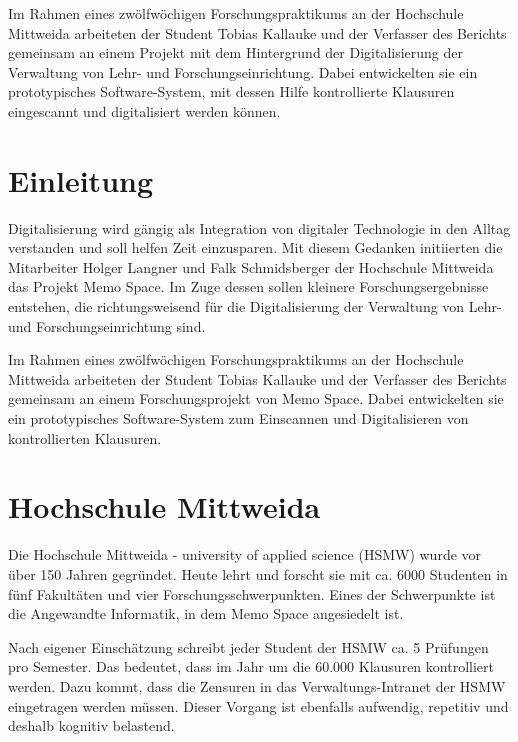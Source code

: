 \documentclass[notables, nomenclature, oneside, 150]{HSMW-Thesis}
\begin{document}
\begin{Referat}
Im Rahmen eines zwölfwöchigen Forschungspraktikums an der Hochschule Mittweida arbeiteten der Student Tobias Kallauke und der Verfasser des Berichts gemeinsam an einem Projekt mit dem Hintergrund der Digitalisierung der Verwaltung von Lehr- und Forschungseinrichtung. Dabei entwickelten sie ein prototypisches Software-System, mit dessen Hilfe kontrollierte Klausuren eingescannt und digitalisiert werden können.
\end{Referat}

\Hauptteil


\chapter{Einleitung}
	Digitalisierung wird gängig als Integration von digitaler Technologie in den Alltag verstanden und soll helfen Zeit einzusparen. Mit diesem Gedanken initiierten die Mitarbeiter Holger Langner und Falk Schmidsberger der Hochschule Mittweida das Projekt Memo Space. Im Zuge dessen sollen kleinere Forschungsergebnisse entstehen, die richtungsweisend für die Digitalisierung der Verwaltung von Lehr- und Forschungseinrichtung sind.

	Im Rahmen eines zwölfwöchigen Forschungspraktikums an der Hochschule Mittweida arbeiteten der Student Tobias Kallauke und der Verfasser des Berichts gemeinsam an einem Forschungsprojekt von Memo Space. Dabei entwickelten sie ein prototypisches Software-System zum Einscannen und Digitalisieren von kontrollierten Klausuren.


\chapter{Hochschule Mittweida}
	Die Hochschule Mittweida - university of applied science (HSMW)  wurde vor über 150 Jahren gegründet. Heute lehrt und forscht sie mit ca. 6000 Studenten in fünf Fakultäten und vier Forschungsschwerpunkten\cite{hochschule_mittweida_hochschule_nodate}. Eines der Schwerpunkte ist die Angewandte Informatik, in dem Memo Space angesiedelt ist.
	
	Nach eigener Einschätzung schreibt jeder Student der HSMW ca. 5 Prüfungen pro Semester. Das bedeutet, dass im Jahr um die 60.000 Klausuren kontrolliert werden. Dazu kommt, dass die Zensuren in das Verwaltungs-Intranet der HSMW eingetragen werden müssen. Dieser Vorgang ist ebenfalls aufwendig, repetitiv und deshalb kognitiv belastend.
	
\end{document}
